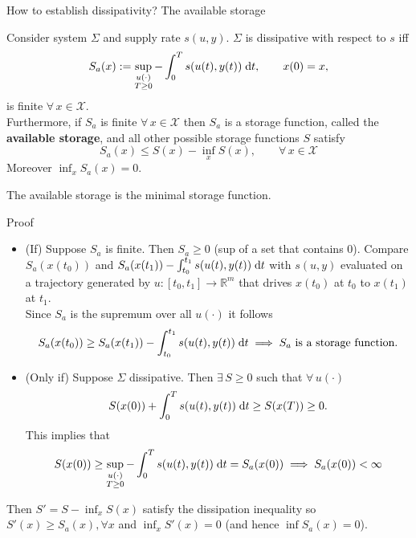 \documentclass[aspectratio=169]{beamer}
\newcommand{\bbR}{\mathbb{R}}
\begin{document}
\begin{frame}{How to establish dissipativity? The available storage}
	
\begin{theorem}
Consider system $\Sigma$ and supply rate $s(u, y)$. $\Sigma$ is dissipative with respect to $s$ iff
\begin{equation}\label{eq:Sa}
	S_a(x):= \sup_{\substack{u(\cdot) \\ T \ge 0}} - \int_0^T s(u(t), y(t)) \d t, \qquad x(0) = x,
\end{equation}
is finite $\forall \, x \in \mathcal{X}$. \\
Furthermore, if $S_a$ is finite $\forall \, x \in \mathcal{X}$ then $S_a$ is a storage function, called the \textbf{available storage}, and all other possible storage functions $S$ satisfy
\begin{equation*}
	S_a(x) \le S(x) - \inf_x S(x), \qquad \forall \,  x \in \mathcal{X}
\end{equation*}
Moreover $\inf_x S_a(x)=0.$
\end{theorem}

The available storage is the minimal storage function.
	
\end{frame}

\begin{frame}{Proof}

		\begin{itemize}
			\item (If) Suppose $S_a$ is finite. Then $S_a \ge 0$ (sup of a set that contains 0).  Compare $S_a(x(t_0))$ and $S_a(x(t_1)) - \int_{t_0}^{t_1} s(u(t), y(t))\d t$ with $s(u, y)$ evaluated on a trajectory generated by $u: [t_0, t_1] \rightarrow \bbR^m$ that drives $x(t_0)$ at $t_0$ to $x(t_1)$ at $t_1$. \\
			Since $S_a$ is the supremum over all $u(\cdot)$ it follows
			\begin{equation*}
				S_a(x(t_0)) \ge S_a(x(t_1)) - \int_{t_0}^{t_1} s(u(t), y(t)) \d t \implies S_a \text{ is a storage function.}
			\end{equation*}
			\item (Only if) Suppose $\Sigma$ dissipative. Then $\exists\,  S \ge 0$ such that $\forall \, u(\cdot)$
			\begin{equation*}
				S(x(0)) + \int_0^T s(u(t), y(t)) \d t \ge S(x(T)) \ge 0.
			\end{equation*}
		This implies that $$S(x(0)) \ge \sup_{\substack{u(\cdot) \\ T \ge 0}} - \int_0^T s(u(t), y(t)) \d t = S_a(x(0)) \implies S_a(x(0)) < \infty$$
		\end{itemize}
		Then $S'= S - \inf_x S(x)$ satisfy the dissipation inequality so $S'(x) \ge S_a(x), \forall x$ and $\inf_x S'(x)=0$ (and hence $\inf S_a(x)=0$).
\end{frame}
\end{document}
